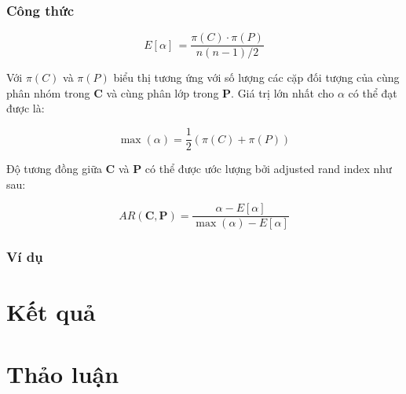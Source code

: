 		\subsubsection{Công thức}
		\begin{center}
		\begin{equation}
			E[\alpha] \, = \frac{\pi(C) \cdot \pi(P)}{n(n - 1) / 2}
		\end{equation}
		\end{center}
		
		Với $\pi(C)$ và $\pi(P)$ biểu thị tương ứng với số lượng các cặp đối tượng của cùng phân nhóm trong $	\textbf{C}$ và cùng phân lớp trong $\textbf{P}$. Giá trị lớn nhất cho $\alpha$ có thể đạt được là:
		\begin{center}
		\begin{equation}
			\max(\alpha) = \frac{1}{2} (\pi(C) + \pi(P))
		\end{equation}
		\end{center}
		
		Độ tương đồng giữa $\textbf{C}$ và $\textbf{P}$ có thể được ước lượng bởi adjusted rand index như sau:
		\begin{center}
		\begin{equation}
			AR(\textbf{C}, \textbf{P}) = \frac{\alpha - E[\alpha]}{\max(\alpha) - E[\alpha]}
		\end{equation}
		\end{center}

		\subsubsection{Ví dụ}

\section{Kết quả}

\section{Thảo luận}



